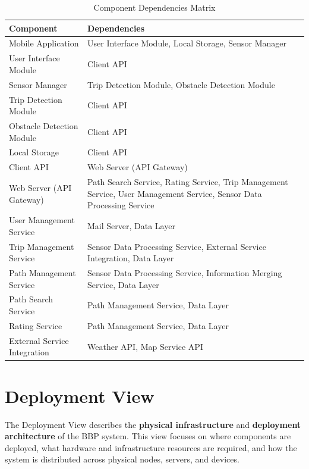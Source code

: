 \begin{table}[H]
\centering
\small
\begin{tabularx}{\textwidth}{|l|X|}
\hline
\textbf{Component} & \textbf{Dependencies} \\
\hline
Mobile Application & User Interface Module, Local Storage, Sensor Manager \\
\hline
User Interface Module & Client API \\
\hline
Sensor Manager & Trip Detection Module, Obstacle Detection Module \\
\hline
Trip Detection Module & Client API \\
\hline
Obstacle Detection Module & Client API \\
\hline
Local Storage & Client API \\
\hline
Client API & Web Server (API Gateway) \\
\hline
Web Server (API Gateway) & Path Search Service, Rating Service, Trip Management Service, User Management Service, Sensor Data Processing Service \\
\hline
User Management Service & Mail Server, Data Layer \\
\hline
Trip Management Service & Sensor Data Processing Service, External Service Integration, Data Layer \\
\hline
Path Management Service & Sensor Data Processing Service, Information Merging Service, Data Layer \\
\hline
Path Search Service & Path Management Service, Data Layer \\
\hline
Rating Service & Path Management Service, Data Layer \\
\hline
External Service Integration & Weather API, Map Service API \\
\hline
\end{tabularx}
\caption{Component Dependencies Matrix}
\label{tab:component_dependencies}
\end{table}

\section{Deployment View}
\label{sec:deployment_view}%

The Deployment View describes the \textbf{physical infrastructure} and \textbf{deployment architecture} of the BBP system. This view focuses on where components are deployed, what hardware and infrastructure resources are required, and how the system is distributed across physical nodes, servers, and devices.

